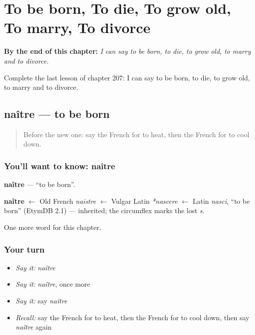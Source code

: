 
\chapter{To be born, To die, To grow old, To marry, To divorce}
\label{ch:fr-to-be-born-to-die-to-grow-old-to-marry-to-divorce}

\begin{chapteropening}
\textbf{By the end of this chapter:} \emph{I can say to be born, to die, to grow old, to marry and to divorce.}

Complete the last lesson of chapter 207: I can say to be born, to die, to grow old, to marry and to divorce.
\end{chapteropening}

\section[naître]{naître — to be born}

\label{lesson:FR-C207-naitre}



\begin{quote}
Before the new one: say the French for to heat, then the French for to cool down.
\end{quote}

\subsection*{You'll want to know: naître}
\textbf{naître} — \textquotedblleft{}to be born\textquotedblright{}.

\begin{cousinweb}
\textbf{naître} $\leftarrow$ Old French \emph{naistre} $\leftarrow$ Vulgar Latin \emph{*nascere} $\leftarrow$ Latin \emph{nasci}, \textquotedblleft{}to be born\textquotedblright{} (EtymDB 2.1) — inherited; the circumflex marks the lost \emph{s}.
\end{cousinweb}

\begin{grammarlens}[title={What you've built}]
One more word for this chapter.
\end{grammarlens}

\subsection*{Your turn}
\begin{itemize}
\raggedright
  \item \emph{Say it:} \emph{naître}
  \item \emph{Say it:} \emph{naître}, once more
  \item \emph{Say it:} say \emph{naître}
  \item \emph{Recall:} say the French for to heat, then the French for to cool down, then say \emph{naître} again
\end{itemize}

